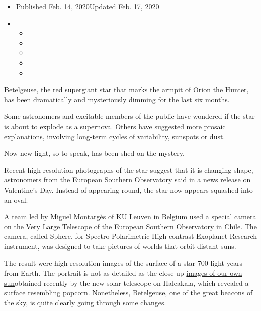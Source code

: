 \begin{itemize}
\item
  Published Feb. 14, 2020Updated Feb. 17, 2020
\item
  \begin{itemize}
  \item
  \item
  \item
  \item
  \item
  \end{itemize}
\end{itemize}

Betelgeuse, the red supergiant star that marks the armpit of Orion the
Hunter, has been
\href{https://www.nytimes3xbfgragh.onion/2020/01/09/science/astronomy-supernova-betelgeuse.html}{dramatically
and mysteriously dimming} for the last six months.

Some astronomers and excitable members of the public have wondered if
the star is
\href{https://www.nytimes3xbfgragh.onion/interactive/2020/01/09/science/betelgeuse-supernova-fading.html}{about
to explode} as a supernova. Others have suggested more prosaic
explanations, involving long-term cycles of variability, sunspots or
dust.

Now new light, so to speak, has been shed on the mystery.

Recent high-resolution photographs of the star suggest that it is
changing shape, astronomers from the European Southern Observatory said
in a \href{https://www.eso.org/public/news/eso2003/?lang}{news release}
on Valentine's Day. Instead of appearing round, the star now appears
squashed into an oval.

A team led by Miguel Montargès of KU Leuven in Belgium used a special
camera on the Very Large Telescope of the European Southern Observatory
in Chile. The camera, called Sphere, for Spectro-Polarimetric
High-contrast Exoplanet Research instrument, was designed to take
pictures of worlds that orbit distant suns.

The result were high-resolution images of the surface of a star 700
light years from Earth. The portrait is not as detailed as the close-up
\href{https://www.nytimes3xbfgragh.onion/2020/01/29/science/daniel-inouye-solar-telescope-pictures.html}{images
of our own sun}obtained recently by the new solar telescope on
Haleakala, which revealed a surface resembling
\href{https://www.nytimes3xbfgragh.onion/2020/01/29/science/daniel-inouye-solar-telescope-pictures.html}{popcorn}.
Nonetheless, Betelgeuse, one of the great beacons of the sky, is quite
clearly going through some changes.


